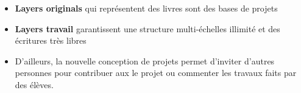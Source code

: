 \begin{itemize}
    \item \textbf{Layers originals} qui représentent des livres sont des bases de projets
    \item \textbf{Layers travail} garantissent une structure multi-échelles illimité et des écritures très libres
    \item D'ailleurs, la nouvelle conception de projets permet d'inviter d'autres personnes pour contribuer aux le projet ou commenter les travaux faits par des élèves. 
\end{itemize}